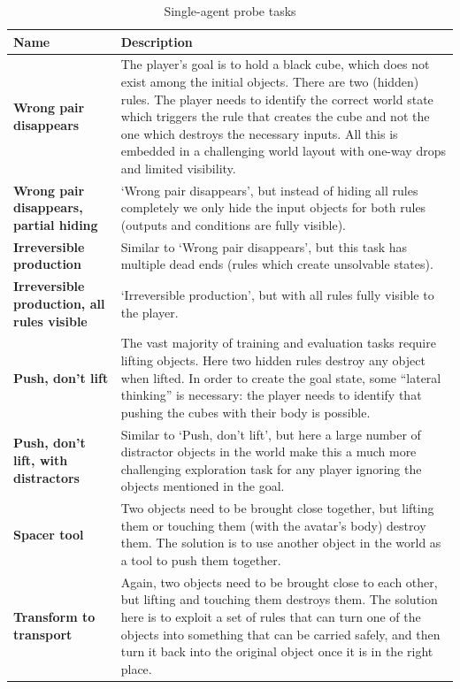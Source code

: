 \documentclass[11pt, a4paper, logo, copyright]{deepmind}
\begin{document}
\begin{appendix}
\renewcommand*{\arraystretch}{1.4}
\begin{longtable}{|>{\raggedright}p{4cm}|p{12cm}|}
\caption{Single-agent probe tasks}
    \label{probe-task-desc-single-agent}
    \\ \hline
\textbf{Name} & \textbf{Description} \\ \hline
\textbf{Wrong pair disappears} & The player’s goal is to hold a black cube, which does not exist among the initial objects. There are two (hidden) rules. The player needs to identify the correct world state which triggers the rule that creates the cube and not the one which destroys the necessary inputs. All this is embedded in a challenging world layout with one-way drops and limited visibility. \\ \hline
\textbf{Wrong pair disappears, partial hiding} & `Wrong pair disappears', but instead of hiding all rules completely we only hide the input objects for both rules (outputs and conditions are fully visible). \\ \hline
\textbf{Irreversible production} & Similar to `Wrong pair disappears', but this task has multiple dead ends (rules which create unsolvable states). \\ \hline
\textbf{Irreversible production, all rules visible} & `Irreversible production', but with all rules fully visible to the player. \\ \hline
\textbf{Push, don't lift} & The vast majority of training and evaluation tasks require lifting objects. Here two hidden rules destroy any object when lifted. In order to create the goal state, some ``lateral thinking'' is necessary: the player needs to identify that pushing the cubes with their body is possible. \\ \hline
\textbf{Push, don't lift, with distractors} & Similar to `Push, don't lift', but here a large number of distractor objects in the world make this a much more challenging exploration task for any player ignoring the objects mentioned in the goal. \\ \hline
\textbf{Spacer tool} & Two objects need to be brought close together, but lifting them or touching them (with the avatar's body) destroy them. The solution is to use another object in the world as a tool to push them together. \\ \hline
\textbf{Transform to transport} & Again, two objects need to be brought close to each other, but lifting and touching them destroys them. The solution here is to exploit a set of rules that can turn one of the objects into something that can be carried safely, and then turn it back into the original object once it is in the right place. \\ \hline

\end{longtable}
\end{appendix}
\end{document}
